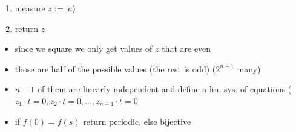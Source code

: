 \documentclass[12pt,a4paper]{article}
\newcommand{\ket}[1]{\vert #1 \rangle}
\begin{document}
\begin{itemize}
\begin{enumerate}
\item measure $z:=\ket{a}$
\item return $z$
\end{enumerate}
\begin{itemize}
\item since we square we only get values of $z$ that are even
\item those are half of the possible values (the rest is odd) ($2^{n-1}$ many)
\item $n-1$ of them are linearly independent and define a lin. sys. of equations ($z_1 \cdot t = 0, z_2 \cdot t = 0, ... ,z_{n-1} \cdot t =0$
\item if $f(0) = f(s)$ return periodic, else bijective
\end{itemize}
\end{itemize}
\end{document}
